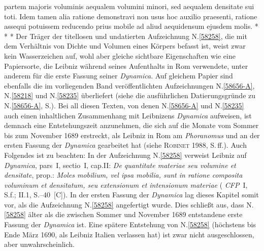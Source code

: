 partem majoris voluminis aequalem volumini minori,
sed aequalem densitate sui toti.
\pend%
\pstart%
Idem tamen alia ratione demonstravi
non usus hoc auxilio praesenti,%
ratione assequi potuissem
reducendo prius mobile
ad aliud aequidensum%
ejusdem molis.%
\pend%
\vspace{3.5em}%
\pstart%
\noindent%
\centering%
*     *     *
\pend%
\vspace{3.0em}%
%
\frenchspacing%
\footnotesize%
\pstart%
\noindent%
%
Der Träger der titellosen und undatierten Aufzeichnung N.\;\ref{58258}, die mit dem Verhältnis von Dichte und Volumen eines Körpers befasst ist, weist zwar kein Wasserzeichen auf, wohl aber gleiche sichtbare Eigenschaften wie eine Papiersorte, die Leibniz während seines Aufenthalts in Rom verwendete, unter anderem für die erste Fassung seiner \textit{Dynamica}.\cite{01354}
Auf gleichem Papier sind ebenfalls die im vorliegenden Band veröffentlichten Aufzeichnungen N.\;\ref{58656-A}, N.\;\ref{58218} und N.\;\ref{58235} überliefert %
(siehe die ausführlichen Datierungsgründe zu N.\;\ref{58656-A}, S.\;\pageref{58656-A_dat}).
Bei all diesen Texten, von denen N.\;\ref{58656-A} und N.\;\ref{58235} auch einen inhaltlichen Zusammenhang mit Leibnizens \textit{Dynamica} aufweisen, %
ist demnach eine Entstehungszeit anzunehmen, die sich auf die Monate vom Sommer bis zum November 1689 erstreckt, als Leibniz in Rom am \textit{Phoranomus}\cite{01402} und an der ersten Fassung der \textit{Dynamica}\cite{01354} gearbeitet hat (siehe \textsc{Robinet} 1988, S.\,ff.).\cite{01240}
\pend%
\pstart%
Auch Folgendes ist zu beachten:
In der Aufzeichnung N.\;\ref{58258} verweist Leibniz auf
\textit{Dynamica}, pars~I, sectio~I,
cap.\;II: \textit{De quantitate materiae seu volumine et densitate},
prop.: \textit{Moles mobilium, vel ipsa mobilia, sunt in ratione composita voluminum et densitatum, seu extensionum et intensionum materiae}
(%
\textit{CFP}~I, S.\:f.\;[A]; II.1, S.--40~[C]).\cite{01354} %
In der ersten Fassung der \textit{Dynamica}\cite{01354} lag dieses Kapitel somit vor, als die Aufzeichnung N.\;\ref{58258} angefertigt wurde.
Dies schließt aus, dass N.\;\ref{58258} älter als die zwischen Sommer und November 1689 entstandene erste Fassung der \textit{Dynamica}\cite{01354} ist.
Eine spätere Entstehung von N.\;\ref{58258} (höchstens bis Ende März 1690, als Leibniz Italien verlassen hat) ist zwar nicht ausgeschlossen, aber unwahrscheinlich.
\pend%
%
\frenchspacing%
\newpage%
